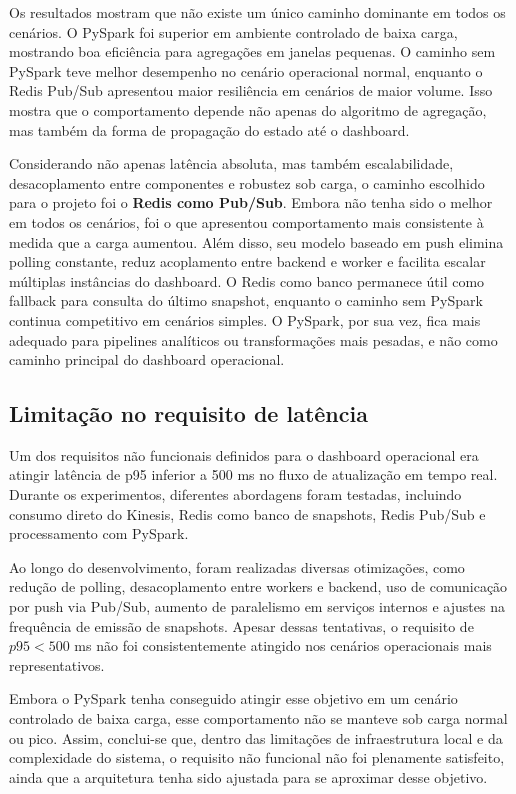 ﻿\documentclass{article}
\begin{document}
Os resultados mostram que não existe um único caminho dominante em todos os cenários. O PySpark foi superior em ambiente controlado de baixa carga, mostrando boa eficiência para agregações em janelas pequenas. O caminho sem PySpark teve melhor desempenho no cenário operacional normal, enquanto o Redis Pub/Sub apresentou maior resiliência em cenários de maior volume. Isso mostra que o comportamento depende não apenas do algoritmo de agregação, mas também da forma de propagação do estado até o dashboard.

Considerando não apenas latência absoluta, mas também escalabilidade, desacoplamento entre componentes e robustez sob carga, o caminho escolhido para o projeto foi o \textbf{Redis como Pub/Sub}. Embora não tenha sido o melhor em todos os cenários, foi o que apresentou comportamento mais consistente à medida que a carga aumentou. Além disso, seu modelo baseado em push elimina polling constante, reduz acoplamento entre backend e worker e facilita escalar múltiplas instâncias do dashboard. O Redis como banco permanece útil como fallback para consulta do último snapshot, enquanto o caminho sem PySpark continua competitivo em cenários simples. O PySpark, por sua vez, fica mais adequado para pipelines analíticos ou transformações mais pesadas, e não como caminho principal do dashboard operacional.

\subsection{Limitação no requisito de latência}

Um dos requisitos não funcionais definidos para o dashboard operacional era atingir latência de p95 inferior a 500 ms no fluxo de atualização em tempo real. Durante os experimentos, diferentes abordagens foram testadas, incluindo consumo direto do Kinesis, Redis como banco de snapshots, Redis Pub/Sub e processamento com PySpark.

Ao longo do desenvolvimento, foram realizadas diversas otimizações, como redução de polling, desacoplamento entre workers e backend, uso de comunicação por push via Pub/Sub, aumento de paralelismo em serviços internos e ajustes na frequência de emissão de snapshots. Apesar dessas tentativas, o requisito de $p95 < 500$ ms não foi consistentemente atingido nos cenários operacionais mais representativos.

Embora o PySpark tenha conseguido atingir esse objetivo em um cenário controlado de baixa carga, esse comportamento não se manteve sob carga normal ou pico. Assim, conclui-se que, dentro das limitações de infraestrutura local e da complexidade do sistema, o requisito não funcional não foi plenamente satisfeito, ainda que a arquitetura tenha sido ajustada para se aproximar desse objetivo.
\end{document}
